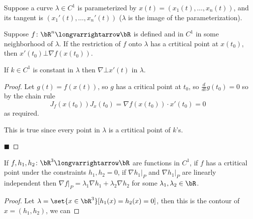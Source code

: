 \documentclass[10pt]{article}
\begin{document}
\begin{lemm*}

    Suppose a curve $\lambda\in C^1$ is parameterized by $x(t)=(x_1(t),\dots,x_n(t))$, and its tangent is $(x_1'(t),\dots,x_n'(t))$ ($\lambda$ is the image of the parameterization).
    \benum
        \item Suppose $f\colon\bR^n\longvarrightarrow\bR$ is defined and in $C^1$ in some neighborhood of $\lambda$.
            If the restriction of $f$ onto $\lambda$ has a crtitical point at $x(t_0)$, then $x'(t_0)\bot\nabla f(x(t_0))$.
        \item If $k\in C^1$ is constant in $\lambda$ then $\nabla\bot x'(t)$ in $\lambda$.
    \eenum

\end{lemm*}

\begin{proof}

    \benum
        \item Let $g(t)=f(x(t))$, so $g$ has a critical point at $t_0$, so $\frac d{dt}g(t_0)=0$ so by the chain rule
        \[ J_f(x(t_0)) J_x(t_0) = \nabla f(x(t_0))\cdot x'(t_0) = 0 \]
        as required.

        \item This is true since every point in $\lambda$ is a crtitical point of $k$'s.
    \eenum

    \hfill$\blacksquare$

\end{proof}

\begin{thrm*}

    If $f,h_1,h_2\colon\bR^3\longvarrightarrow\bR$ are functions in $C^1$, if $f$ has a crtitical point under the constraints $h_1,h_2=0$, if $\nabla h_1\big|_P$ and $\nabla h_1\big|_P$ are linearly
    independent then $\nabla f\big|_P=\lambda_1\nabla h_1+\lambda_2\nabla h_2$ for some $\lambda_1,\lambda_2\in\bR$.

\end{thrm*}

\begin{proof}

    Let $\lambda=\set{x\in\bR^3}[h_1(x)=h_2(x)=0]$, then this is the contour of $x=(h_1,h_2)$, we can 

\end{proof}
\end{document}
